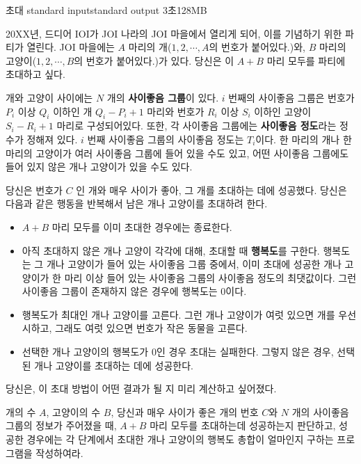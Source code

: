 \begin{problem}{초대}
	{standard input}{standard output}
	{3초}{128MB}{}
	
	20XX년, 드디어 IOI가 JOI 나라의 JOI 마을에서 열리게 되어, 이를 기념하기 위한 파티가 열린다. JOI 마을에는 $A$ 마리의 개($1, 2, \cdots, A$의 번호가 붙어있다.)와,  $B$ 마리의 고양이($1, 2, \cdots, B$의 번호가 붙어있다.)가 있다. 당신은 이 $A+B$ 마리 모두를 파티에 초대하고 싶다.
	
	개와 고양이 사이에는 $N$ 개의 \textbf{사이좋음 그룹}이 있다. $i$ 번째의 사이좋음 그룹은 번호가 $P_i$ 이상 $Q_i$ 이하인 개 $Q_i - P_i+1$ 마리와 번호가 $R_i$ 이상 $S_i$ 이하인 고양이 $S_i- R_i+1$ 마리로 구성되어있다. 또한, 각 사이좋음 그룹에는 \textbf{사이좋음 정도}라는 정수가 정해져 있다. $i$ 번째 사이좋음 그룹의 사이좋음 정도는 $T_i$이다. 한 마리의 개나 한 마리의 고양이가 여러 사이좋음 그룹에 들어 있을 수도 있고, 어떤 사이좋음 그룹에도 들어 있지 않은 개나 고양이가 있을 수도 있다.
	
	당신은 번호가 $C$ 인 개와 매우 사이가 좋아, 그 개를 초대하는 데에 성공했다. 당신은 다음과 같은 행동을 반복해서 남은 개나 고양이를 초대하려 한다.
	
	\begin{itemize}
		\item $A+B$ 마리 모두를 이미 초대한 경우에는 종료한다.
		\item 아직 초대하지 않은 개나 고양이 각각에 대해, 초대할 때 \textbf{행복도}를 구한다. 행복도는 그 개나 고양이가 들어 있는 사이좋음 그룹 중에서, 이미 초대에 성공한 개나 고양이가 한 마리 이상 들어 있는 사이좋음 그룹의 사이좋음 정도의 최댓값이다. 그런 사이좋음 그룹이 존재하지 않은 경우에 행복도는 0이다.
		\item 행복도가 최대인 개나 고양이를 고른다. 그런 개나 고양이가 여럿 있으면 개를 우선시하고, 그래도 여럿 있으면 번호가 작은 동물을 고른다.
		\item 선택한 개나 고양이의 행복도가 0인 경우 초대는 실패한다. 그렇지 않은 경우, 선택된 개나 고양이를 초대하는 데에 성공한다.
	\end{itemize}

	당신은, 이 초대 방법이 어떤 결과가 될 지 미리 계산하고 싶어졌다.
	
	개의 수 $A$, 고양이의 수 $B$, 당신과 매우 사이가 좋은 개의 번호 $C$와 $N$ 개의 사이좋음 그룹의 정보가 주어졌을 때, $A+B$ 마리 모두를 초대하는데 성공하는지 판단하고, 성공한 경우에는 각 단계에서 초대한 개나 고양이의 행복도 총합이 얼마인지 구하는 프로그램을 작성하여라.
	
	\Constraints
	

\end{problem}
